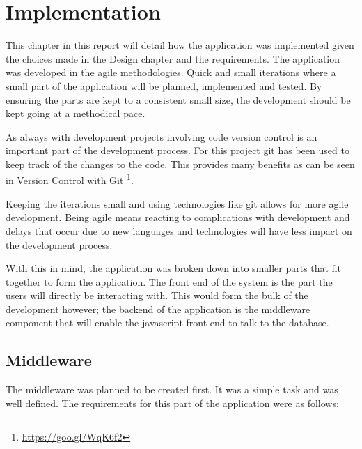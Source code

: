 \chapter{Implementation}\label{implementation}

This chapter in this report will detail how the application was
implemented given the choices made in the Design chapter and the
requirements. The application was developed in the agile methodologies.
Quick and small iterations where a small part of the application will be
planned, implemented and tested. By ensuring the parts are kept to a
consistent small size, the development should be kept going at a
methodical pace.

As always with development projects involving code version control is an
important part of the development process. For this project git has been
used to keep track of the changes to the code. This provides many
benefits as can be seen in Version Control with Git%
\footnote{\url{https://goo.gl/WqK6f2}}.

Keeping the iterations small and using technologies like git allows for more
agile development. Being agile means reacting to complications with development
and delays that occur due to new languages and technologies will have less
impact on the development process.

With this in mind, the application was broken down into smaller parts
that fit together to form the application. The front end of the system
is the part the users will directly be interacting with. This would form
the bulk of the development however; the backend of the application is
the middleware component that will enable the javascript front end to
talk to the database.

\section{Middleware}\label{middleware}

The middleware was planned to be created first. It was a simple task and
was well defined. The requirements for this part of the application were
as follows:

